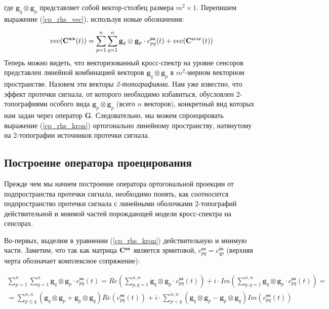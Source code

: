 где $\mathbf{g}_q \otimes \mathbf{g}_p$ представляет собой вектор-столбец размера $m^2 \times 1$.
Перепишем выражение (\ref{cp_rhs_vec}), используя новые обозначения:

\begin{equation}
    vec(\mathbf{C}^{\mathbf{x x}}(t)) = \sum\limits_{p=1}^n\sum\limits_{q=1}^n \mathbf{g}_q\otimes \mathbf{g}_p \cdot c_{pq}^{\mathbf{ss}}(t) + vec(\mathbf{C}^{\mathbf{\upomega \upomega}}(t))
    \label{cp_rhs_kron}
\end{equation}
Теперь можно видеть, что векторизованный кросс-спектр на уровне сенсоров представлен линейной
комбинацией векторов $\mathbf{g}_q \otimes \mathbf{g}_p$ в $m^2$-мерном векторном пространстве.
Назовем эти векторы \emph{2-топографиями}.
Нам уже известно, что эффект протечки сигнала, от которого необходимо избавиться,
обусловлен 2-топографиями особого вида $\mathbf{g}_p \otimes \mathbf{g}_p$ (всего $n$ векторов),
конкретный вид которых нам задан через оператор $\mathbf{G}$.
Следовательно, мы можем спроецировать выражение (\ref{cp_rhs_kron}) ортогонально линейному пространству,
натянутому на 2-топографии источников протечки сигнала.

\subsection{Построение оператора проецирования}
Прежде чем мы начнем построение оператора ортогональной проекции от подпространства протечки сигнала,
необходимо понять, как соотносится подпространство протечки сигнала с линейными оболочками
2-топографий действительной и мнимой частей порождающей модели кросс-спектра на сенсорах.

Во-первых, выделим в уравнении (\ref{cp_rhs_kron}) действительную и мнимую части.
Заметим, что так как матрица $\mathbf{C}^{\mathbf{s s}}$ является эрмитовой,
$c^{\mathbf{ss}}_{pq} = \overline{c^{\mathbf{ss}}_{qp}}$ (верхняя черта обозначает комплексное сопряжение):

\begin{gather}
                      \sum\limits_{p=1}^n\sum\limits_{q=1}^n \mathbf{g}_q\otimes \mathbf{g}_p \cdot c_{pq}^{\mathbf{ss}}(t) =
             Re\left(\sum\limits_{p,q=1}^{n,n} \mathbf{g}_q\otimes \mathbf{g}_p \cdot c_{pq}^{\mathbf{ss}}(t)\right) +
     i \cdot Im\left(\sum\limits_{p,q=1}^{n,n} \mathbf{g}_q\otimes \mathbf{g}_p \cdot c_{pq}^{\mathbf{ss}}(t)\right) = \nonumber \\
           = \sum\limits_{p\leq q}^{n,n} (\mathbf{g}_q\otimes \mathbf{g}_p + \mathbf{g}_p\otimes \mathbf{g}_q)
                                                                                    Re\left(c_{pq}^{\mathbf{ss}}(t)\right) +
     i \cdot \sum\limits_{p<q}^{n,n} (\mathbf{g}_q\otimes \mathbf{g}_p - \mathbf{g}_p\otimes \mathbf{g}_q)
                                                                                    Im\left(c_{pq}^{\mathbf{ss}}(t)\right)
    \label{cp_re_im}
\end{gather}

